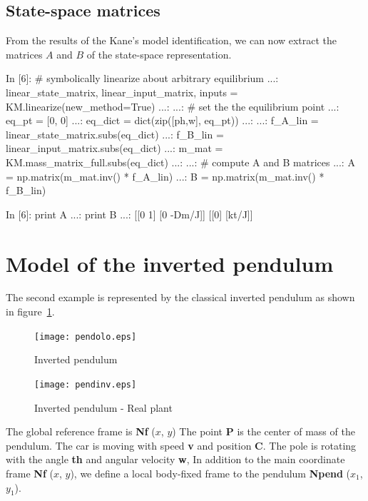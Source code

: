 \subsection{State-space matrices}
From the results of the Kane's model identification, we can now extract the 
matrices $A$ and $B$ of the state-space representation.

\begin{code}
In [6]: # symbolically linearize about arbitrary equilibrium
   ...: linear_state_matrix, linear_input_matrix, inputs = 
KM.linearize(new_method=True)
   ...: 
   ...: # set the the equilibrium point
   ...: eq_pt = [0, 0]
   ...: eq_dict = dict(zip([ph,w], eq_pt))
   ...: 
   ...: f_A_lin = linear_state_matrix.subs(eq_dict)
   ...: f_B_lin = linear_input_matrix.subs(eq_dict)
   ...: m_mat = KM.mass_matrix_full.subs(eq_dict)
   ...: 
   ...: # compute A and B matrices
   ...: A = np.matrix(m_mat.inv() * f_A_lin)
   ...: B = np.matrix(m_mat.inv() * f_B_lin)
\end{code}

\begin{code}
In [6]: print A
   ...: print B
   ...: 
[[0 1]
 [0 -Dm/J]]
[[0]
 [kt/J]]
\end{code}

\section{Model of the inverted pendulum}

The second example is represented by the classical inverted pendulum as shown 
in figure~\ref{F9a}.

\begin{figure}[htbp]	%
\centering
\vspace{8mm}
\texttt{[image: pendolo.eps]}
\caption{Inverted pendulum}
\label{F9a}
\vspace{8mm}
\end{figure}

\begin{figure}[htbp]	%
\centering
\vspace{8mm}
\texttt{[image: pendinv.eps]}
\caption{Inverted pendulum - Real plant}
\label{F9_a}
\vspace{8mm}
\end{figure}

The global reference frame is \textbf{Nf} ($x$, $y$)
The point \textbf{P} is the center of mass of the pendulum. The car is moving 
with speed \textbf{v} and position \textbf{C}.
The pole is rotating with the angle \textbf{th} and angular velocity 
\textbf{w}, 
In addition to the main coordinate frame \textbf{Nf} ($x$, $y$), we define a 
local body-fixed frame to the pendulum \textbf{Npend} ($x_1$, $y_1$).

